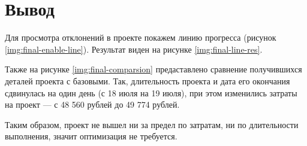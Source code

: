 

\clearpage
\section*{Вывод}

Для просмотра отклонений в проекте покажем линию прогресса (рисунок \ref{img:final-enable-line}). Результат виден на рисунке \ref{img:final-line-res}.

Также на рисунке \ref{img:final-comparsion} предаставлено сравнение получившихся деталей проекта с базовыми. Так, длительность проекта и дата его окончания сдвинулась на один день (с 18 июля на 19 июля), при этом изменились затраты на проект --- с 48 560 рублей до 49 774 рублей.

Таким образом, проект не вышел ни за предел по затратам, ни по длительности выполнения, значит оптимизация не требуется.

